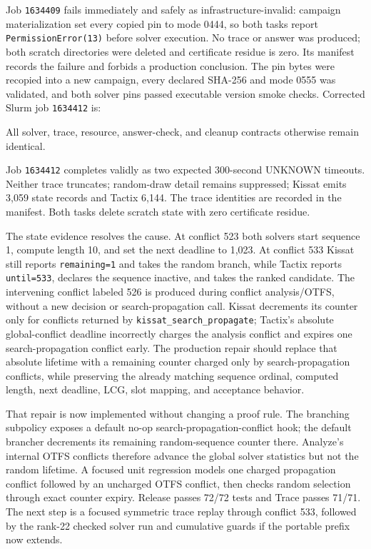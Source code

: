\documentclass[11pt]{article}
\newcommand{\code}[1]{\texttt{#1}}
\newcommand{\artifact}[1]{\path{#1}}
\begin{document}
Job \code{1634409} fails immediately and safely as infrastructure-invalid:
campaign materialization set every copied pin to mode 0444, so both tasks
report \code{PermissionError(13)} before solver execution. No trace or answer
was produced; both scratch directories were deleted and certificate residue
is zero. Its manifest records the failure and forbids a production conclusion.
The pin bytes were recopied into a new campaign, every declared SHA-256 and
mode 0555 was validated, and both solver pins passed executable version smoke
checks. Corrected Slurm job \code{1634412} is:
\begin{center}\small\artifact{20260819-0028-tierd-rank22-randec-state-rerun2}\end{center}
All solver, trace, resource, answer-check, and cleanup contracts otherwise
remain identical.

Job \code{1634412} completes validly as two expected 300-second UNKNOWN
timeouts. Neither trace truncates; random-draw detail remains suppressed;
Kissat emits 3,059 state records and Tactix 6,144. The trace identities are
recorded in the manifest. Both tasks delete scratch state with zero certificate
residue.

The state evidence resolves the cause. At conflict 523 both solvers start
sequence 1, compute length 10, and set the next deadline to 1,023. At conflict
533 Kissat still reports \code{remaining=1} and takes the random branch, while
Tactix reports \code{until=533}, declares the sequence inactive, and takes the
ranked candidate. The intervening conflict labeled 526 is produced during
conflict analysis/OTFS, without a new decision or search-propagation call.
Kissat decrements its counter only for conflicts returned by
\code{kissat\_search\_propagate}; Tactix's absolute global-conflict deadline
incorrectly charges the analysis conflict and expires one search-propagation
conflict early. The production repair should replace that absolute lifetime
with a remaining counter charged only by search-propagation conflicts, while
preserving the already matching sequence ordinal, computed length, next
deadline, LCG, slot mapping, and acceptance behavior.

That repair is now implemented without changing a proof rule. The branching
subpolicy exposes a default no-op search-propagation-conflict hook; the default
brancher decrements its remaining random-sequence counter there. Analyze's
internal OTFS conflicts therefore advance the global solver statistics but not
the random lifetime. A focused unit regression models one charged propagation
conflict followed by an uncharged OTFS conflict, then checks random selection
through exact counter expiry. Release passes 72/72 tests and Trace passes
71/71. The next step is a focused symmetric trace replay through conflict 533,
followed by the rank-22 checked solver run and cumulative guards if the portable
prefix now extends.
\end{document}
